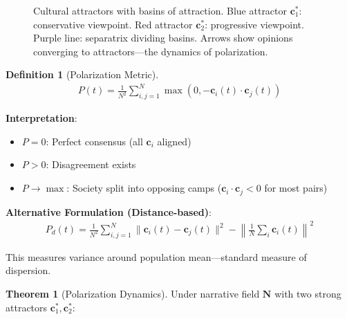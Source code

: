 \documentclass[11pt,a4paper]{article}
\theoremstyle{definition}
\newtheorem{definition}{Definition}[section]
\newtheorem{theorem}{Theorem}[section]
\theoremstyle{remark}
\newcommand{\cc}{\mathbf{c}}
\begin{document}
\begin{enumerate}
\begin{figure}[H]
\caption{Cultural attractors with basins of attraction. Blue attractor \(\cc^*_1\): conservative viewpoint. Red attractor \(\cc^*_2\): progressive viewpoint. Purple line: separatrix dividing basins. Arrows show opinions converging to attractors—the dynamics of polarization.}
\label{fig:attractor_basins}
\end{figure}

\begin{definition}[Polarization Metric]
\begin{align}
P(t) = \frac{1}{N^2} \sum_{i,j=1}^N \max(0, -\cc_i(t) \cdot \cc_j(t))
\end{align}

\textbf{Interpretation}:
\begin{itemize}
    \item \(P = 0\): Perfect consensus (all \(\cc_i\) aligned)
    \item \(P > 0\): Disagreement exists
    \item \(P \to \max\): Society split into opposing camps (\(\cc_i \cdot \cc_j < 0\) for most pairs)
\end{itemize}

\textbf{Alternative Formulation (Distance-based)}:
\begin{align}
P_d(t) = \frac{1}{N^2} \sum_{i,j=1}^N \|\cc_i(t) - \cc_j(t)\|^2 - \left\|\frac{1}{N}\sum_i \cc_i(t)\right\|^2
\end{align}

This measures variance around population mean—standard measure of dispersion.
\end{definition}

\begin{theorem}[Polarization Dynamics]
Under narrative field \(\mathbf{N}\) with two strong attractors \(\cc^*_1, \cc^*_2\):


\end{theorem}
\end{enumerate}
\end{document}
